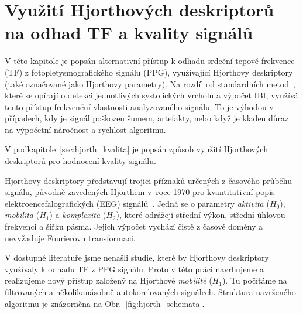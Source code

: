 
\chapter{Využití Hjorthových deskriptorů na odhad TF a kvality signálů}
\label{ch:hjorth}
V této kapitole je popsán alternativní přístup k odhadu srdeční tepové frekvence (\acs{TF}) z fotopletysmografického signálu (\acs{PPG}), využívající Hjorthovy deskriptory (také označované jako Hjorthovy parametry).
Na rozdíl od standardních metod~\cite{ENIKÖ,Charlton2022,NeuroKit2}, které se opírají o detekci jednotlivých systolických vrcholů a výpočet \acs{IBI}, využívá tento přístup frekvenční vlastnosti analyzovaného signálu.
To je výhodou v případech, kdy je signál poškozen šumem, artefakty, nebo když je kladen důraz na výpočetní náročnost a rychlost algoritmu.

V podkapitole~\ref{sec:hjorth_kvalita} je popsán způsob využití Hjorthových deskriptorů pro hodnocení kvality signálu. %

Hjorthovy deskriptory představují trojici příznaků určených z časového průběhu signálu, původně zavedených Hjorthem v~roce 1970 pro kvantitativní popis elektroencefalografických (\acs{EEG}) signálů~\cite{Hjorth1970,Hjorth1973}.
Jedná se o parametry \textit{aktivita} (\(H_0\)), \textit{mobilita} (\(H_1\)) a \textit{komplexita} (\(H_2\)), které odrážejí střední výkon, střední úhlovou frekvenci a šířku pásma.
Jejich výpočet vychází čistě z časové domény a nevyžaduje Fourierovu transformaci.

V dostupné literatuře jsme nenašli studie, které by Hjorthovy deskriptory využívaly k odhadu \acs{TF} z \acs{PPG} signálu.
Proto v této práci navrhujeme a realizujeme nový přístup založený na Hjorthově \textit{mobilitě} (\(H_1\)).
Tu počítáme na filtrovaných a několikanásobně autokorelovaných signálech.
Struktura navrženého algoritmu je znázorněna na Obr.~\ref{fig:hjorth_schemata}.

